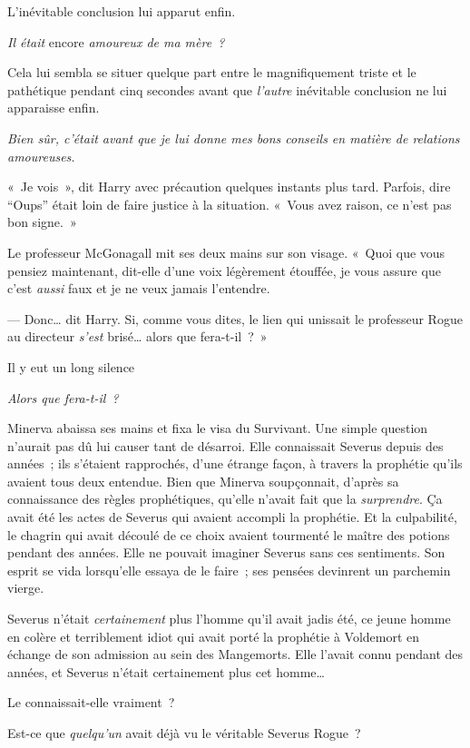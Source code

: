 L'inévitable conclusion lui apparut enfin.

\emph{Il était} encore \emph{amoureux de ma mère~?}

Cela lui sembla se situer quelque part entre le magnifiquement triste et le pathétique pendant cinq secondes avant que \emph{l'autre} inévitable conclusion ne lui apparaisse enfin.

\emph{Bien sûr, c'était avant que je lui donne mes bons conseils en matière de relations amoureuses.}

«~Je vois~», dit Harry avec précaution quelques instants plus tard. Parfois, dire “Oups” était loin de faire justice à la situation. «~Vous avez raison, ce n'est pas bon signe.~»

Le professeur McGonagall mit ses deux mains sur son visage. «~Quoi que vous pensiez maintenant, dit-elle d'une voix légèrement étouffée, je vous assure que c'est \emph{aussi} faux et je ne veux jamais l'entendre.

--- Donc… dit Harry. Si, comme vous dites, le lien qui unissait le professeur Rogue au directeur \emph{s'est} brisé… alors que fera-t-il~?~»

Il y eut un long silence

\later

\emph{Alors que fera-t-il~?}

Minerva abaissa ses mains et fixa le visa du Survivant. Une simple question n'aurait pas dû lui causer tant de désarroi. Elle connaissait Severus depuis des années~; ils s'étaient rapprochés, d'une étrange façon, à travers la prophétie qu'ils avaient tous deux entendue. Bien que Minerva soupçonnait, d'après sa connaissance des règles prophétiques, qu'elle n'avait fait que la \emph{surprendre}. Ça avait été les actes de Severus qui avaient accompli la prophétie. Et la culpabilité, le chagrin qui avait découlé de ce choix avaient tourmenté le maître des potions pendant des années. Elle ne pouvait imaginer Severus sans ces sentiments. Son esprit se vida lorsqu'elle essaya de le faire~; ses pensées devinrent un parchemin vierge.

Severus n'était \emph{certainement} plus l'homme qu'il avait jadis été, ce jeune homme en colère et terriblement idiot qui avait porté la prophétie à Voldemort en échange de son admission au sein des Mangemorts. Elle l'avait connu pendant des années, et Severus n'était certainement plus cet homme…

Le connaissait-elle vraiment~?

Est-ce que \emph{quelqu'un} avait déjà vu le véritable Severus Rogue~?

